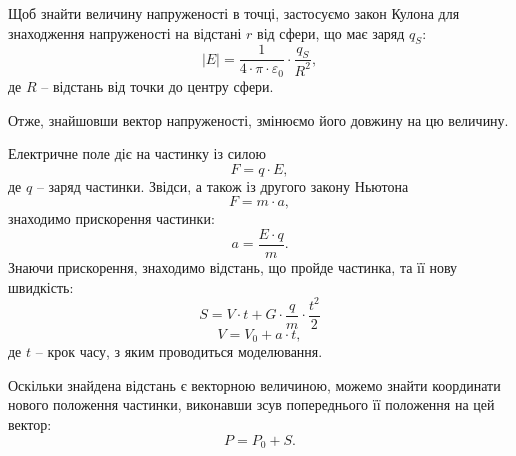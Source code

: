 \documentclass[a4paper,12pt]{article}
\begin{document}
Щоб знайти величину напруженості в точці, застосуємо закон Кулона для знаходження напруженості на відстані $r$ від сфери, що має заряд $q_S$:
\[
|E| = \frac{1}{4 \cdot \pi \cdot \varepsilon_0} \cdot \frac{q_S}{R^2},
\]
де $R$ -- відстань від точки до центру сфери.

Отже, знайшовши вектор напруженості, змінюємо його довжину на цю величину.

Електричне поле діє на частинку із силою
\[
F = q \cdot E,
\]
де $q$ -- заряд частинки.
Звідси, а також із другого закону Ньютона
\[
F = m \cdot a,
\]
знаходимо прискорення частинки:
\[
a = \frac{E \cdot q}{m}.
\]
Знаючи прискорення, знаходимо відстань, що пройде частинка, та її нову швидкість:
\[
S = V \cdot t + G \cdot \frac{q}{m} \cdot \frac{t^2}{2}
\]
\[
V = V_{0} + a \cdot t,
\]
де $t$ -- крок часу, з яким проводиться моделювання.

Оскільки знайдена відстань є векторною величиною, можемо знайти координати нового положення частинки, виконавши зсув попереднього її положення на цей вектор:
\[
P = P_0 + S.
\]
 
 
\end{document}

